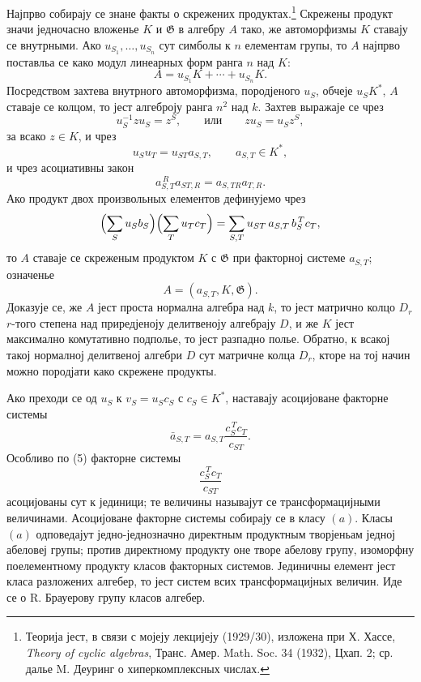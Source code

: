 ﻿\documentclass[11pt]{article}
\newcommand{\foreign}[1]{#1}
\providecommand{\Gg}{\mathfrak G}
\begin{document}
Најпрво собирају се знане факты о скрежених продуктах.\footnote{Теорија јест, в связи с мојеју лекцијеју (1929/30), изложена при Х. Хассе, \foreign{\emph{Theory of cyclic algebras}}, Транс. Амер. Math. Soc. 34 (1932), Цхап. 2; ср. далье M. Деуринг о хиперкомплексных числах.} Скрежены продукт значи једночасно вложенье \(K\) и \(\Gg\) в алгебру \(A\) тако, же автоморфизмы \(K\) ставају се внутрными. Ако \(u_{S_1},\ldots,u_{S_n}\) сут симболы к \(n\) елементам групы, то \(A\) најпрво поставльа се како модул линеарных форм ранга \(n\) над \(K\):
\[
        A=u_{S_1}K+\cdots+u_{S_n}K .                         \tag{1}
\]
Посредством захтева внутрного автоморфизма, породјеного \(u_S\), обчеје \(u_S K^*\), \(A\) ставаје се колцом, то јест алгеброју ранга \(n^2\) над \(k\). Захтев выражаје се чрез
\[
        u_S^{-1}zu_S=z^S,\qquad\text{или}\qquad
        z u_S=u_S z^S,                                      \tag{2}
\]
за всако \(z\in K\), и чрез
\[
        u_Su_T=u_{ST}a_{S,T},\qquad a_{S,T}\in K^*,           \tag{3}
\]
и чрез асоциативны закон
\[
        a_{S,T}^{\,R}a_{ST,R}=a_{S,TR}a_{T,R}.                \tag{4}
\]
Ако продукт двох произвольных елементов дефинујемо чрез
\[
 \Bigl(\sum_S u_S b_S\Bigr)\Bigl(\sum_T u_T c_T\Bigr)
   =\sum_{S,T}u_{ST}\,a_{S,T}\,b_S^{\,T}c_T ,
\]
то \(A\) ставаје се скреженым продуктом \(K\) с \(\Gg\) при факторној системе \(a_{S,T}\); означенье
\[
        A=(a_{S,T},K,\Gg).
\]
Доказује се, же \(A\) јест проста нормална алгебра над \(k\), то јест матрично колцо \(D_r\) \(r\)-того степена над приредјеноју делитвеноју алгебрају \(D\), и же \(K\) јест максимално комутативно подполье, то јест разпадно полье. Обратно, к всакој такој нормалној делитвеној алгебри \(D\) сут матричне колца \(D_r\), кторе на тој начин можно породјати како скрежене продукты.

Ако преходи се од \(u_S\) к \(v_S=u_Sc_S\) с \(c_S\in K^*\), наставају асоцијоване факторне системы
\[
        \bar a_{S,T}
        =a_{S,T}\frac{c_S^{\,T}c_T}{c_{ST}} .                 \tag{5}
\]
Особливо по (5) факторне системы
\[
        \frac{c_S^{\,T}c_T}{c_{ST}}
\]
асоцијованы сут к јединици; те величины называјут се трансформацијными величинами. Асоцијоване факторне системы собирају се в класу \((a)\). Класы \((a)\) одповедајут једно-једнозначно директным продуктным творјеньам једној абеловеј групы; против директному продукту оне творе абелову групу, изоморфну поелементному продукту класов факторных системов. Јединичны елемент јест класа разложених алгебер, то јест систем всих трансформацијных величин. Иде се о R. Брауерову групу класов алгебер.
\end{document}
